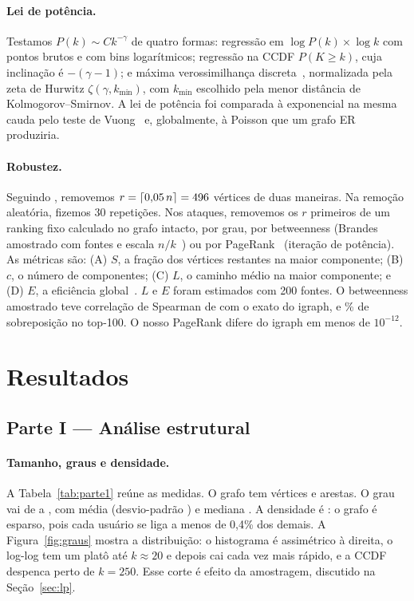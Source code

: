 \IfFileExists{webmedia.cls}{\documentclass[sigconf]{webmedia}}{\documentclass[sigconf]{acmart}}
\begin{document}
\paragraph{Lei de potência.} Testamos $P(k) \sim C k^{-\gamma}$ de quatro formas: regressão em $\log P(k) \times \log k$ com pontos brutos e com bins logarítmicos; regressão na CCDF $P(K \geq k)$, cuja inclinação é $-(\gamma - 1)$; e máxima verossimilhança discreta~\cite{clauset2009}, normalizada pela zeta de Hurwitz $\zeta(\gamma, k_{\min})$, com $k_{\min}$ escolhido pela menor distância de Kolmogorov--Smirnov. A lei de potência foi comparada à exponencial na mesma cauda pelo teste de Vuong~\cite{vuong1989} e, globalmente, à Poisson que um grafo ER produziria.

\paragraph{Robustez.} Seguindo \citet{albert2000}, removemos $r = \lceil 0{,}05\,n \rceil = 496$ vértices de duas maneiras. Na remoção aleatória, fizemos 30 repetições. Nos ataques, removemos os $r$ primeiros de um ranking fixo calculado no grafo intacto, por grau, por betweenness (Brandes~\cite{brandes2001} amostrado com \brandesFontes{} fontes e escala $n/k$~\cite{brandes2007}) ou por PageRank~\cite{page1999} (iteração de potência). As métricas são: (A) $S$, a fração dos vértices restantes na maior componente; (B) $c$, o número de componentes; (C) $L$, o caminho médio na maior componente; e (D) $E$, a eficiência global~\cite{latora2001}. $L$ e $E$ foram estimados com 200 fontes. O betweenness amostrado teve correlação de Spearman de \brandesSpearman{} com o exato do igraph, e \brandesTopCem\% de sobreposição no top-100. O nosso PageRank difere do igraph em menos de $10^{-12}$.

\section{Resultados}\label{sec:resultados}
\subsection{Parte I --- Análise estrutural}


\paragraph{Tamanho, graus e densidade.} A Tabela~\ref{tab:parte1} reúne as medidas. O grafo tem \nV{} vértices e \nE{} arestas. O grau vai de \grauMin{} a \grauMax, com média \grauMedio{} (desvio-padrão \desvioGrau) e mediana \grauMediano. A densidade é \densidade: o grafo é esparso, pois cada usuário se liga a menos de 0,4\% dos demais. A Figura~\ref{fig:graus} mostra a distribuição: o histograma é assimétrico à direita, o log-log tem um platô até $k \approx 20$ e depois cai cada vez mais rápido, e a CCDF despenca perto de $k = 250$. Esse corte é efeito da amostragem, discutido na Seção~\ref{sec:lp}.
\end{document}
